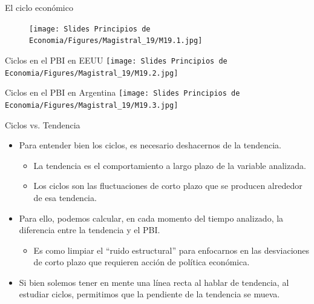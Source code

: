 \documentclass{beamer}
\begin{document}
\begin{frame}{El ciclo económico}
    \begin{figure} [H]   
        \texttt{[image: Slides Principios de Economia/Figures/Magistral\_19/M19.1.jpg]}
    \end{figure}
\end{frame}

\begin{frame}{Ciclos en el PBI en EEUU}
\centering\texttt{[image: Slides Principios de Economia/Figures/Magistral\_19/M19.2.jpg]}
\end{frame}

\begin{frame}{Ciclos en el PBI en Argentina}
\centering\texttt{[image: Slides Principios de Economia/Figures/Magistral\_19/M19.3.jpg]}
\end{frame}

\begin{frame}{Ciclos vs. Tendencia}
    \begin{itemize}
        \item Para entender bien los ciclos, es necesario deshacernos de la tendencia. 
            \begin{itemize}
            \item La tendencia es el comportamiento a largo plazo de la variable analizada.
            \item Los ciclos son las fluctuaciones de corto plazo que se producen alrededor de esa tendencia.
            \end{itemize} \vspace{1mm}
        \item Para ello, podemos calcular, en cada momento del tiempo analizado, la diferencia entre la tendencia y el PBI. 
        \begin{itemize}
            \item Es como limpiar el “ruido estructural” para enfocarnos en las desviaciones de corto plazo que requieren acción de política económica.
            \end{itemize} \vspace{1mm}
        \item Si bien solemos tener en mente una línea recta al hablar de tendencia, al estudiar ciclos, permitimos que la pendiente de la tendencia se mueva. 
    \end{itemize}
\end{frame}
\end{document}
